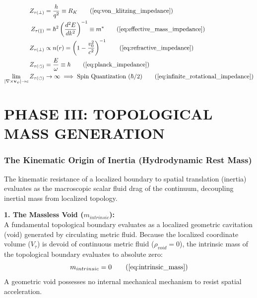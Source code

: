 \documentclass[11pt, a4paper]{article}
\begin{document}
\begin{tcolorbox}[recallbox, title={\ref{box:universal_impedance}. The Kinematic Impedance Tensor ($[\boldsymbol{Z}_{\tau}]$)}]
\begin{align}
    Z_{\tau(\perp)} &= \frac{h}{q^2} \equiv R_K \tag{\ref{eq:von_klitzing_impedance}} \\
    Z_{\tau(\parallel)} &= \hbar^2 \left( \frac{d^2 E}{dk^2} \right)^{-1} \equiv m^* \tag{\ref{eq:effective_mass_impedance}} \\
    Z_{\tau(\perp)} &\propto n(r) = \left( 1 - \frac{v_0^2}{c^2} \right)^{-1} \tag{\ref{eq:refractive_impedance}} \\
    Z_{\tau(\circlearrowleft)} &= \frac{E}{\omega} \equiv \hbar \tag{\ref{eq:planck_impedance}} \\
    \lim_{|\nabla \times \mathbf{v}_{\psi}| \to c} Z_{\tau(\circlearrowleft)} &\to \infty \implies \text{Spin Quantization } (\hbar/2) \tag{\ref{eq:infinite_rotational_impedance}}
\end{align}
\end{tcolorbox}




\part*{PHASE III: TOPOLOGICAL MASS GENERATION}






\section{The Kinematic Origin of Inertia (Hydrodynamic Rest Mass)}
\label{sec:deriv_hydrodynamic_mass}

The kinematic resistance of a localized boundary to spatial translation (inertia) evaluates as the macroscopic scalar fluid drag of the continuum, decoupling inertial mass from localized topology.

\textbf{1. The Massless Void ($m_{intrinsic}$):} \\
A fundamental topological boundary evaluates as a localized geometric cavitation (void) generated by circulating metric fluid. Because the localized coordinate volume ($V_\tau$) is devoid of continuous metric fluid ($\rho_{void} = 0$), the intrinsic mass of the topological boundary evaluates to absolute zero:
\begin{equation}
    m_{intrinsic} = 0 \tag{\ref{eq:intrinsic_mass}}
\end{equation}
A geometric void possesses no internal mechanical mechanism to resist spatial acceleration.
\end{document}
